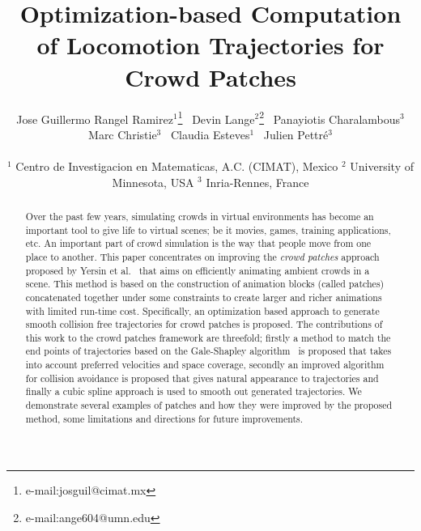 \documentclass[conference]{acmsiggraph}
\title{Optimization-based Computation of Locomotion Trajectories for Crowd Patches}
\author{
	Jose Guillermo Rangel Ramirez{$^1$}\thanks{e-mail:josguil@cimat.mx}~
	Devin Lange{$^2$}\thanks{e-mail:ange604@umn.edu}~
	Panayiotis Charalambous{$^3$}\\
	Marc Christie{$^3$}~
	Claudia Esteves{$^1$}~
	Julien Pettr\'e{$^3$}
	\\\\
	$^1$ Centro de Investigacion en Matematicas, A.C. (CIMAT), Mexico
	$^2$ University of Minnesota, USA
	$^3$ Inria-Rennes, France
}
\newcommand{\etal}{et al.\xspace}
\begin{document}

\maketitle

\begin{abstract}

Over the past few years, simulating crowds in virtual environments has become an important tool to give life to virtual scenes; be it movies, games, training applications, etc.
An important part of crowd simulation is the way that people
move from one place to another.
This paper concentrates on improving the \emph{crowd patches} approach proposed by Yersin \etal~\cite{Yersin:2009} that aims on efficiently animating ambient crowds in a scene.
This method is based on the construction of animation blocks (called patches) concatenated together under some constraints to create larger and richer animations with limited run-time cost.
Specifically, an optimization based approach to generate smooth collision free trajectories for crowd patches is proposed.
The contributions of this work to the crowd patches framework are threefold; firstly a method to match the end points of trajectories based on the Gale-Shapley algorithm~\cite{gale1962college} is proposed that takes into account preferred velocities and space coverage, secondly an improved algorithm for collision avoidance is proposed that gives natural appearance to trajectories and finally a cubic spline approach is used to smooth out generated trajectories.
We demonstrate several examples of patches and how they were improved by the proposed method, some limitations and directions for future improvements.

\end{abstract}
\end{document}
